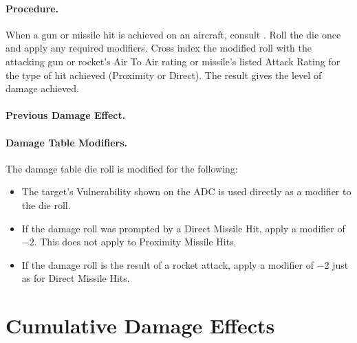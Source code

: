 {\paragraph{Procedure.} When a gun or missile hit is achieved on an aircraft, consult . Roll the die once and apply any required modifiers. Cross index the modified roll with the attacking gun or rocket's Air To Air rating or missile's listed Attack Rating for the type of hit achieved (Proximity or Direct). The result gives the level of damage achieved.

\paragraph{Previous Damage Effect.} 

\paragraph{Damage Table Modifiers.} The damage table die roll is modified for the following:

\begin{itemize}

    \item{} The target's Vulnerability shown on the ADC is used directly as a modifier to the die roll.
    
    \item{} If the damage roll was prompted by a Direct Missile Hit, apply a modifier of $-2$. This does not apply to Proximity Missile Hits.
    
    \item{} If the damage roll is the result of a rocket attack, apply a modifier of $-2$ just as for Direct Missile Hits.
    
\end{itemize}


\section{Cumulative Damage Effects}

}
